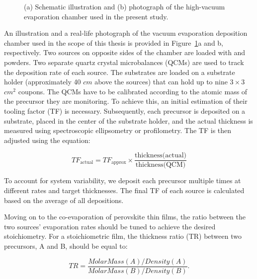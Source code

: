 \begin{figure}[htbp]
    \caption[Illustration and optical image of the employed vacuum evaporation chamber.]{(a) Schematic illustration and (b) photograph of the high-vacuum evaporation chamber used in the present study.}
    \label{fig:deposition_chamber}
\end{figure}



An illustration and a real-life photograph of the vacuum evaporation deposition chamber used in the scope of this thesis is provided in Figure~\ref{fig:deposition_chamber}a and b, respectively. Two sources on opposite sides of the chamber are loaded with  and  powders. Two separate quartz crystal microbalances (QCMs) are used to track the deposition rate of each source. The substrates are loaded on a substrate holder (approximately 40 $cm$ above the sources) that can hold up to nine $3\times 3$ $cm^2$ coupons. The QCMs have to be calibrated according to the atomic mass of the precursor they are monitoring. To achieve this, an initial estimation of their tooling factor (TF) is necessary. Subsequently, each precursor is deposited on a  substrate, placed in the center of the substrate holder, and the actual thickness is measured using spectroscopic ellipsometry or profilometry. The TF is then adjusted using the equation: 

\begin{equation}
    TF_{\text{actual}} = TF_{\text{approx}} \times \frac{\text{thickness(actual)}}{\text{thickness(QCM)}}
\end{equation}

To account for system variability, we deposit each precursor multiple times at different rates and target thicknesses. The final TF of each source is calculated based on the average of all depositions.


Moving on to the co-evaporation of perovskite thin films, the ratio between the two sources' evaporation rates should be tuned to achieve the desired stoichiometry. For a stoichiometric film, the thickness ratio (TR) between two precursors, A and B, should be equal to: 

\begin{equation}
    TR = \frac{MolarMass(A)/Density(A)}{MolarMass(B)/Density(B)}.
\end{equation}

